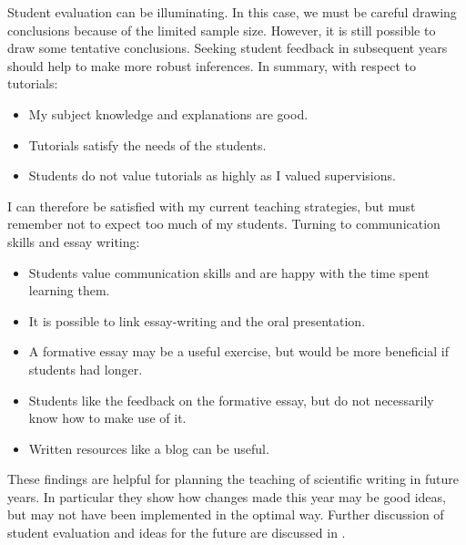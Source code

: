 Student evaluation can be illuminating. In this case, we must be careful drawing conclusions because of the limited sample size. However, it is still possible to draw some tentative conclusions. Seeking student feedback in subsequent years should help to make more robust inferences. In summary, with respect to tutorials:
\begin{itemize}
\item My subject knowledge and explanations are good.
\item Tutorials satisfy the needs of the students.
\item Students do not value tutorials as highly as I valued supervisions.
\end{itemize}
I can therefore be satisfied with my current teaching strategies, but must remember not to expect too much of my students. Turning to communication skills and essay writing:
\begin{itemize}
\item Students value communication skills and are happy with the time spent learning them.
\item It is possible to link essay-writing and the oral presentation.
\item A formative essay may be a useful exercise, but would be more beneficial if students had longer.
\item Students like the feedback on the formative essay, but do not necessarily know how to make use of it.
\item Written resources like a blog can be useful.
\end{itemize}
These findings are helpful for planning the teaching of scientific writing in future years. In particular they show how changes made this year may be good ideas, but may not have been implemented in the optimal way. Further discussion of student evaluation and ideas for the future are discussed in .
